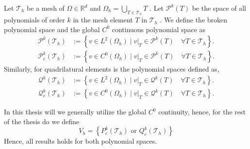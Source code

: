\begin{definition}
    Let $\mathcal{T}_{h} $ be a mesh of $\Omega \in \mathbb{R} ^{d} $ and $\Omega _{h} = \bigcup_{T \in \mathcal{T}_{h} } T$ . Let $\mathcal{P}^{k}(T) $ be the space of all polynomials of order $k$ in the mesh element $T$ in $\mathcal{T}_{h}$ . We define the broken polynomial space and the global $C^{0}$ continuous polynomial space as
    \begin{equation}
        \begin{split}
    \mathcal{P}^{k} ( \mathcal{T}_{h} ) & := \left\{ v \in L^{2}( \Omega _{h} )    \mid  v|_{T} \in \mathcal{P}^k( T) \quad  \forall T \in  \mathcal{T}_{h}   \right\}. \\
    \mathcal{P}^{k}_{c} ( \mathcal{T}_{h} ) & := \left\{ v \in C^{0}( \Omega _{h}  )   \mid  v|_{T} \in \mathcal{P}^k( T) \quad  \forall T \in  \mathcal{T}_{h}   \right\}.
        \end{split}
    \end{equation}
    Similarly, for quadrilatural elements is the polynomial spaces defined as,
    \begin{equation}
        \begin{split}
    \mathcal{Q}^{k} ( \mathcal{T}_{h} ) & := \left\{ v \in L^{2}( \Omega _{h} )    \mid  v|_{T} \in \mathcal{Q}^k( T) \quad  \forall T \in  \mathcal{T}_{h}   \right\}. \\
    \mathcal{Q}^{k}_{c} ( \mathcal{T}_{h} ) & := \left\{ v \in C^{0}( \Omega _{h} )   \mid  v|_{T} \in \mathcal{Q}^k( T) \quad  \forall T \in  \mathcal{T}_{h}   \right\}.
        \end{split}
    \end{equation}

\end{definition}

In this thesis will we generally utilize the global $C^{0}$ continuity, hence, for the rest of the thesis do we define
\begin{equation}
    \label{def:Vh_background}
V_{h} =  \left\{ P_{c}^{k}( \mathcal{T}_{h} ) \text{ or }  Q_{c}^{k}( \mathcal{T}_{h} )
 \right\} \end{equation}
Hence, all results holds for both polynomial spaces.

